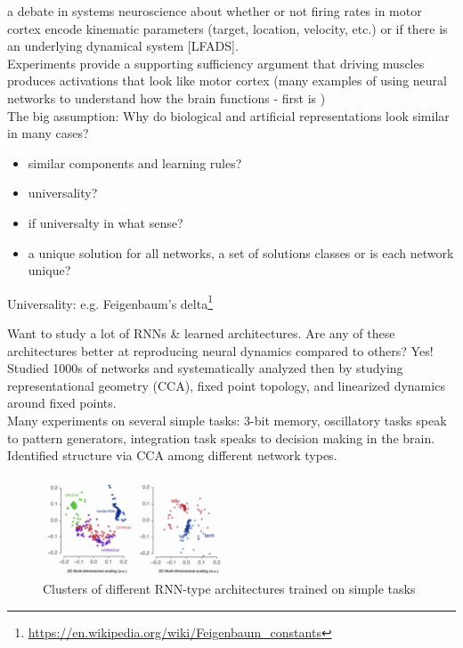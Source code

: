 \documentclass[12pt]{article}
\begin{document}
\cite{Churchland2012, Sussillo2015} a debate in systems neuroscience about whether or not firing rates in motor cortex encode kinematic parameters (target, location, velocity, etc.) or if there is an underlying dynamical system [LFADS].  \\

Experiments provide a supporting sufficiency argument that driving muscles produces activations that look like motor cortex (many examples of using neural networks to understand how the brain functions - first is \cite{Zipser1988}) \\

The big assumption: Why do biological and artificial representations look similar in many cases?
\begin{itemize}
    \item similar components and learning rules?
    \item universality?
    \item if universalty in what sense?
    \item a unique solution for all networks, a set of solutions classes or is each network unique?
\end{itemize}

Universality: e.g. Feigenbaum's delta\footnote{\url{https://en.wikipedia.org/wiki/Feigenbaum_constants}}

Want to study a lot of RNNs \& learned architectures. Are any of these architectures better at reproducing neural dynamics compared to others? Yes! Studied 1000s of networks and systematically analyzed then by studying representational geometry (CCA), fixed point topology, and linearized dynamics around fixed points. \\

Many experiments on several simple tasks: 3-bit memory, oscillatory tasks speak to pattern generators, integration task speaks to decision making in the brain. \\

Identified structure via CCA among different network types.
\begin{figure}
  \centering
      \includegraphics[width=0.5\textwidth]{images/nnclust.png}
  \caption{Clusters of different RNN-type architectures trained on simple tasks}
\end{figure}
\end{document}
